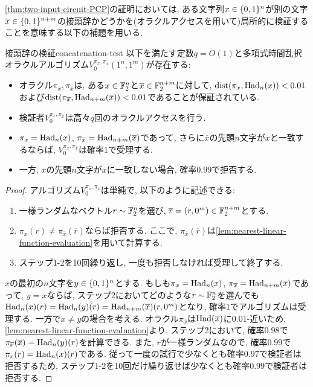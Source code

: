 \cref{thm:two-input-circuit-PCP}の証明においては, ある文字列$x\in\{0,1\}^n$が別の文字$\overline{x}\in\{0,1\}^{n+m}$の接頭辞かどうかを(オラクルアクセスを用いて)局所的に検証することを意味する以下の補題を用いる.
\begin{lemma}{接頭辞の検証}{concatenation-test}
  以下を満たす定数$q=O(1)$と多項式時間乱択オラクルアルゴリズム$V_0^{\pi_x,\pi_{\overline{x}}}(1^n,1^m)$が存在する:
  \begin{itemize}
    \item オラクル$\pi_x,\pi_{\overline{x}}$は, ある$x\in\mathbb{F}_2^n$と$\overline{x}\in\mathbb{F}_2^{n+m}$に対して, $\mathrm{dist}(\pi_x,\mathrm{Had}_n(x))<0.01$および$\mathrm{dist}(\pi_{\overline{x}},\mathrm{Had}_{n+m}(\overline{x}))<0.01$であることが保証されている.
    \item 検証者$V_0^{\pi_x,\pi_{\overline{x}}}$は高々$q$回のオラクルアクセスを行う.
    \item $\pi_x = \mathrm{Had}_n(x)$, $\pi_{\overline{x}}=\mathrm{Had}_{n+m}(\overline{x})$であって, さらに$\overline{x}$の先頭$n$文字が$x$と一致するならば, $V_0^{\pi_x,\pi_{\overline{x}}}$は確率$1$で受理する.
    \item 一方, $\overline{x}$の先頭$n$文字が$x$に一致しない場合, 確率$0.99$で拒否する.
  \end{itemize}
\end{lemma}
\begin{proof}
  アルゴリズム$V_0^{\pi_x,\pi_{\overline{x}}}$は単純で, 以下のように記述できる:
  \begin{enumerate}
    \item 一様ランダムなベクトル$r\sim\mathbb{F}_2^n$を選び, $\overline{r}=(r,0^m)\in\mathbb{F}_2^{n+m}$とする.
    \item $\pi_x(r) \ne \pi_{\overline{x}}(\overline{r})$ならば拒否する. ここで, $\pi_{\overline{x}}(\overline{r})$は\cref{lem:nearest-linear-function-evaluation}を用いて計算する.
    \item ステップ1-2を10回繰り返し, 一度も拒否しなければ受理して終了する.
  \end{enumerate}

  $\overline{x}$の最初の$n$文字を$y\in\{0,1\}^n$とする.
  もしも$\pi_x=\mathrm{Had}_n(x)$, $\pi_{\overline{x}}=\mathrm{Had}_{n+m}(\overline{x})$であって, $y=x$ならば, ステップ2においてどのような$r\sim\mathbb{F}_2^n$を選んでも$\mathrm{Had}_n(x)(r) = \mathrm{Had}_n(y)(r) = \mathrm{Had}_{n+m}(\overline{x})(r,0^m)$となり, 確率$1$でアルゴリズムは受理する.
  一方で$x\ne y$の場合を考える. オラクル$\pi_{\overline{x}}$は$\mathrm{Had}(\overline{x})$に$0.01$-近いため,
  \cref{lem:nearest-linear-function-evaluation}より, ステップ2において, 確率$0.98$で$\pi_{\overline{x}}(\overline{x})=\mathrm{Had}_n(y)(r)$を計算できる. また, $r$が一様ランダムなので, 確率$0.99$で$\pi_x(r)=\mathrm{Had}_n(x)(r)$である.
  従って一度の試行で少なくとも確率$0.97$で検証者は拒否するため,
  ステップ1-2を10回だけ繰り返せば少なくとも確率$0.99$で検証者は拒否する.
\end{proof}

